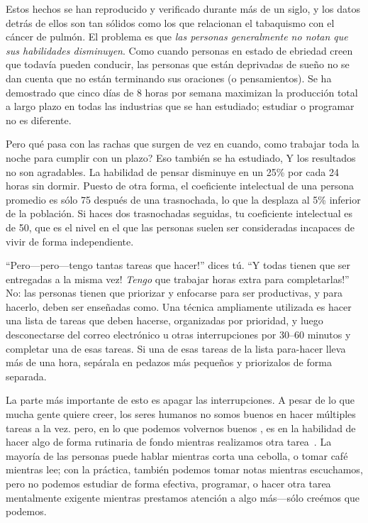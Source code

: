 Estos hechos se han reproducido y verificado durante más de un siglo,
y los datos detrás de ellos son tan sólidos como los que relacionan el tabaquismo con el cáncer de pulmón.
El problema es que
\emph{las personas generalmente no notan que sus habilidades disminuyen}.
Como cuando personas en estado de ebriedad creen que todavía pueden conducir,
las personas que están deprivadas de sueño no se dan cuenta que
no están terminando sus oraciones (o pensamientos).
Se ha demostrado que cinco días de 8 horas por semana maximizan la producción total a largo plazo
en todas las industrias que se han estudiado;
estudiar o programar no es diferente.

Pero qué pasa con las rachas que surgen de vez en cuando,
como trabajar toda la noche para cumplir con un plazo?
Eso también se ha estudiado,
Y los resultados no son agradables.
La habilidad de pensar disminuye en un 25\% por cada 24 horas sin dormir.
Puesto de otra forma,
el coeficiente intelectual de una persona promedio es sólo 75 después de una trasnochada,
lo que la desplaza al 5\% inferior de la población.
Si haces dos trasnochadas seguidas, tu coeficiente intelectual es de 50,
que es el nivel en el que las personas suelen ser consideradas incapaces de vivir de forma independiente.

``Pero---pero---tengo tantas tareas que hacer!'' dices tú.
``Y todas tienen que ser entregadas a la misma vez!
\emph{Tengo} que trabajar horas extra para completarlas!''
No:
las personas tienen que priorizar y enfocarse para ser productivas,
y para hacerlo,
deben ser enseñadas como.
Una técnica ampliamente utilizada es hacer una lista de tareas que deben hacerse,
organizadas por prioridad,
y luego desconectarse del correo electrónico u otras interrupciones por 30--60 minutos
y completar una de esas tareas.
Si una de esas tareas de la lista para-hacer lleva más de una hora,
sepárala en pedazos más pequeños y priorizalos de forma separada.

La parte más importante de esto es apagar las interrupciones.
A pesar de lo que mucha gente quiere creer,
los seres humanos no somos buenos en hacer múltiples tareas a la vez.
pero, en lo que podemos volvernos buenos ,
es en la habilidad de hacer algo de forma rutinaria de fondo
mientras realizamos otra tarea~\cite{Mill2016a}.
La mayoría de las personas puede hablar mientras corta una cebolla,
o tomar café mientras lee;
con la práctica,
también podemos tomar notas mientras escuchamos,
pero no podemos estudiar de forma efectiva,
programar,
o hacer otra tarea mentalmente exigente mientras prestamos atención a algo más---sólo
creémos que podemos.

